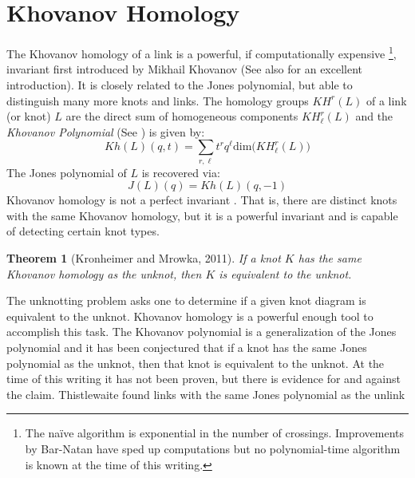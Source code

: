 \documentclass{article}
\theoremstyle{plain}
\newtheorem{theorem}{Theorem}
\begin{document}
    \section{Khovanov Homology}
        The Khovanov homology of a link is a powerful, if computationally
        expensive%
        \footnote{%
            The na\"{i}ve algorithm is exponential in the number of
            crossings. Improvements by Bar-Natan \cite{BarNatan2006FASTKH}
            have sped up computations but no polynomial-time algorithm is
            known at the time of this writing.
        },
        invariant first introduced by Mikhail Khovanov
        \cite{Khovanov1999CatJonesPoly} (See also \cite{BarNatanKhovanovJones}
        for an excellent introduction). It is closely related to the Jones
        polynomial, but able to distinguish many more knots and links. The
        homology groups $KH^{r}(L)$ of a link (or knot) $L$ are the direct sum
        of homogeneous components $KH_{\ell}^{r}(L)$ and the
        \textit{Khovanov Polynomial} (See \cite{KatlasKhoHo}) is given by:
        \begin{equation}
            Kh(L)(q,t)=
            \sum_{r,\ell}t^{r}q^{\ell}\textrm{dim}\big(KH_{\ell}^{r}(L)\big)
        \end{equation}
        The Jones polynomial of $L$ is recovered via:
        \begin{equation}
            J(L)(q)=Kh(L)(q,-1)
        \end{equation}
        Khovanov homology is not a perfect invariant
        \cite{Watson2007KnotsWI}. That is, there are
        distinct knots with the same Khovanov homology, but it is a powerful
        invariant and is capable of detecting certain knot types.
        \begin{theorem}[Kronheimer and Mrowka, 2011]
            If a knot $K$ has the same Khovanov homology as the unknot, then $K$
            is equivalent to the unknot.
        \end{theorem}
        The unknotting problem asks one to determine if a given knot diagram is
        equivalent to the unknot. Khovanov homology is a powerful enough tool
        to accomplish this task. The Khovanov polynomial is a generalization of
        the Jones polynomial and it has been conjectured that if a
        knot has the same Jones polynomial as the unknot, then that knot is
        equivalent to the unknot. At the time of this writing it has not been
        proven, but there is evidence for and against the claim.
        Thistlewaite found links with the same Jones polynomial as the unlink
\end{document}
